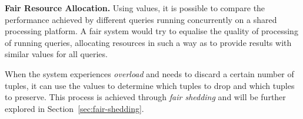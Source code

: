 \textbf{Fair Resource Allocation.} Using \sic values, it is possible to compare the performance
achieved by different queries running concurrently on a shared processing platform. A fair system would
try to equalise the quality of processing of running queries, allocating resources in such a way as to
provide results with similar \sic values for all queries.

When the system experiences \emph{overload} and needs to discard a certain number of tuples, it can use
the \sic values to determine which tuples to drop and which tuples to preserve. This process is achieved
through \emph{fair shedding} and will be further explored in Section~\ref{sec:fair-shedding}.
\vspace{-10pt}